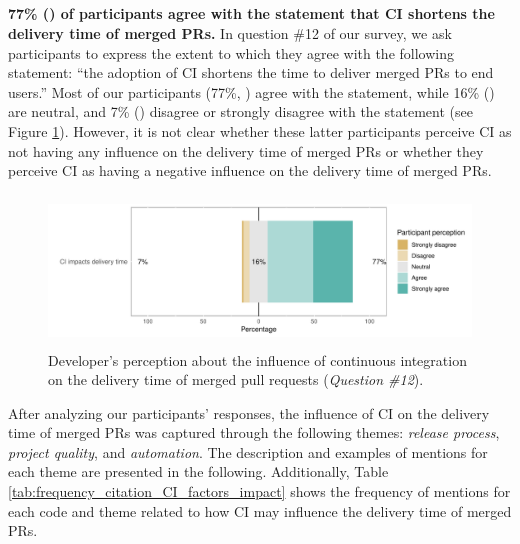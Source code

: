 \subsection*{\textbf{\RQfive}}

\vspace{3mm}	
\noindent\textbf{77\% () of participants agree with the statement that CI shortens the delivery time of merged PRs.}
In question \#12 of our survey, we ask participants to express the extent to which they agree with the following statement: ``the adoption of CI shortens the time to deliver merged PRs to end users.'' Most of our participants (77\%, ) agree with the statement, while 16\% () are neutral, and 7\% () disagree or strongly disagree with the statement (see Figure \ref{fig:developer_perception_about_impact_of_ci_on_delivery_time}). However, it is not clear whether these latter participants perceive CI as not having any influence on the delivery time of merged PRs or whether they perceive CI as having a negative influence on the delivery time of merged PRs.

\begin{figure}[h!]
	\includegraphics[height=4cm, width=12cm]{developers_accordance_on_the_impact_of_ci_on_delivery_time.pdf}
	\caption{Developer's perception about the influence of continuous integration on the delivery time of merged pull requests (\textit{Question \#12}).}
	\label{fig:developer_perception_about_impact_of_ci_on_delivery_time}       %
\end{figure}

After analyzing our participants' responses, the influence of CI on the delivery time of merged PRs was captured through the following themes: \textit{release process}, \textit{project quality}, and \textit{automation}. The description and examples of mentions for each theme are presented in the following. Additionally, Table \ref{tab:frequency_citation_CI_factors_impact} shows the frequency of mentions for each code and theme related to how CI may influence the delivery time of merged PRs. 

